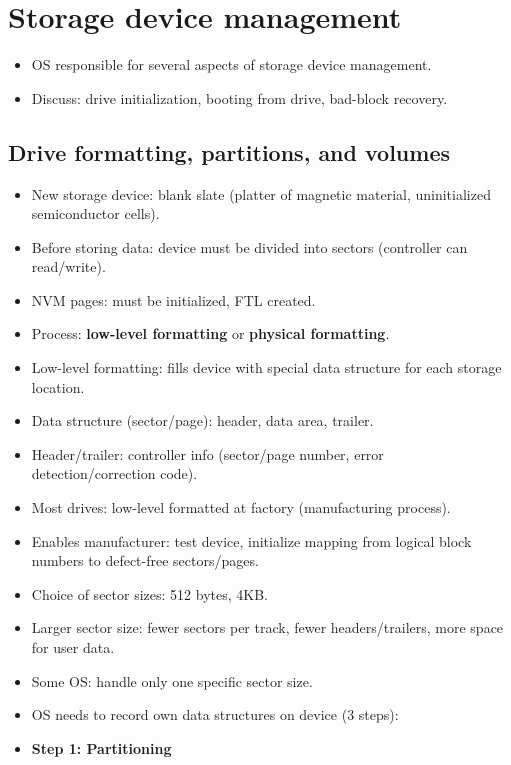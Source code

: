 \section{Storage device management}

\begin{itemize}
    \item OS responsible for several aspects of storage device management.
    \item Discuss: drive initialization, booting from drive, bad-block recovery.
\end{itemize}

\subsection{Drive formatting, partitions, and volumes}
\begin{itemize}
    \item New storage device: blank slate (platter of magnetic material, uninitialized semiconductor cells).
    \item Before storing data: device must be divided into sectors (controller can read/write).
    \item NVM pages: must be initialized, FTL created.
    \item Process: \textbf{low-level formatting} or \textbf{physical formatting}.
    \item Low-level formatting: fills device with special data structure for each storage location.
    \item Data structure (sector/page): header, data area, trailer.
    \item Header/trailer: controller info (sector/page number, error detection/correction code).
    \item Most drives: low-level formatted at factory (manufacturing process).
    \item Enables manufacturer: test device, initialize mapping from logical block numbers to defect-free sectors/pages.
    \item Choice of sector sizes: 512 bytes, 4KB.
    \item Larger sector size: fewer sectors per track, fewer headers/trailers, more space for user data.
    \item Some OS: handle only one specific sector size.
    \item OS needs to record own data structures on device (3 steps):
    \item \textbf{Step 1: Partitioning}
    \begin{itemize}

\end{itemize}
\end{itemize}
